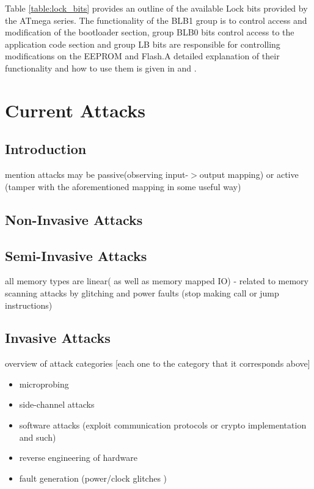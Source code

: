 \documentclass[12pt,a4paper,twocolumn]{article}
\begin{document}
Table \ref{table:lock_bits}	 provides an outline of the available Lock bits provided by the ATmega series. The functionality of the BLB1 group is to control access and modification of the bootloader section, group BLB0 bits control access to the application code section and group LB bits are responsible for controlling modifications on the EEPROM and Flash.A detailed explanation of their functionality and how to use them is given in \citep{atmega1284_manual} and \citep{atmega644_manual}.
	
\section{Current Attacks}
	\subsection{Introduction}
	mention attacks may be passive(observing input-$>$output mapping) or active (tamper with the aforementioned mapping in some useful way)
	\subsection{Non-Invasive Attacks}
	\subsection{Semi-Invasive Attacks}
		all memory types are linear( as well as memory mapped IO) - related to memory scanning attacks by glitching and power faults (stop making call or jump instructions)
	\subsection{Invasive Attacks}

	overview of attack categories [each one to the category that it corresponds above]
	\begin{itemize}
		\item microprobing \\
		\item side-channel attacks \\
		\item software attacks (exploit communication protocols or crypto implementation and such) \\
		\item reverse engineering of hardware\\
		\item fault generation (power/clock glitches ) \\
	\end{itemize}
	
\end{document}
